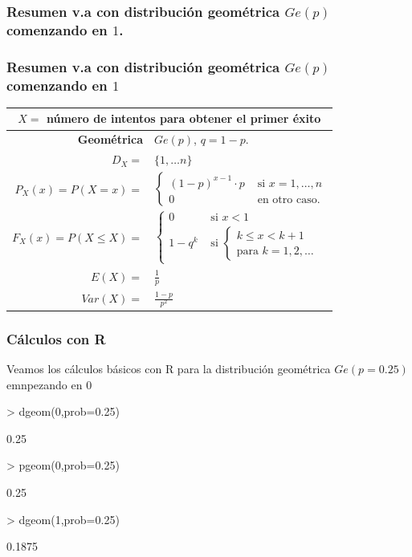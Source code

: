 \documentclass[handout]{beamer}
\renewcommand{\leq}{\leqslant}
\theoremstyle{plain}
\theoremstyle{definition}
\begin{document}
\begin{frame}
\subsubsection{Resumen v.a con distribución geométrica $Ge(p)$ comenzando en $1$.}

\frametitle{Resumen v.a con distribución geométrica $Ge(p)$ comenzando  en $1$}
\setlength{\tabcolsep}{1pt}
\begin{table}
\centering
\begin{tabular}{|rl|}
\hline 
\multicolumn{2}{|c|}{$X=$ número de intentos  para obtener el primer éxito}\\ 
\hline
\hline
\textbf{Geométrica} & $Ge(p)$, $q=1-p$.\\
\hline \hline 
$D_X=$&  $\{1,\ldots n\}$ \\\hline 
$P_X(x)=P(X=x)=$ & 
$\left\{
\begin{array}{ll}
  (1-p)^{x-1}\cdot p & \mbox{ si } x=1,\ldots,n\\
     0  & \mbox{ en otro caso.}
     \end{array}\right.$
\\ \hline 
$F_X(x)=P(X\leq X)=$ & $\left\{\begin{array}{ll} 0 & \mbox{ si } x<1\\
  1- q^{k} & \mbox{ si } \left\{ \begin{array}{l}k\leq x< k+1\\\mbox{para } k=1,2,\ldots\end{array}
    \right.\end{array}\right.$ \\\hline 
$E(X)=$ &  $\frac{1}{p}$ \\
$Var(X)=$ & $\frac{1-p}{p^2}$\\
\hline
\end{tabular}
\end{table}
\setlength{\tabcolsep}{6pt}
\end{frame}

\begin{frame}[fragile]
\frametitle{Cálculos con R}
Veamos los cálculos básicos con  R para la distribución geométrica  $Ge(p=0.25)$ emnpezando en $0$

\begin{Schunk}
\begin{Sinput}
> dgeom(0,prob=0.25)
\end{Sinput}
\begin{Soutput}
[1] 0.25
\end{Soutput}
\begin{Sinput}
> pgeom(0,prob=0.25)
\end{Sinput}
\begin{Soutput}
[1] 0.25
\end{Soutput}
\begin{Sinput}
> dgeom(1,prob=0.25)
\end{Sinput}
\begin{Soutput}
[1] 0.1875
\end{Soutput}
\end{Schunk}

\end{frame}
\end{document}
